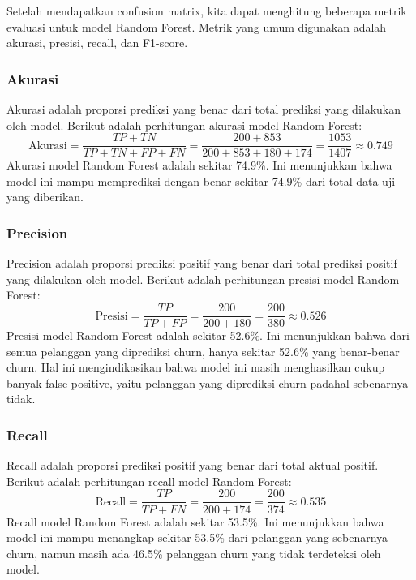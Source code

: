 Setelah mendapatkan confusion matrix, kita dapat menghitung beberapa metrik evaluasi untuk model Random Forest. Metrik yang umum digunakan adalah akurasi, presisi, recall, dan F1-score.

\subsubsection*{Akurasi}
Akurasi adalah proporsi prediksi yang benar dari total prediksi yang dilakukan oleh model. Berikut adalah perhitungan akurasi model Random Forest:
\begin{equation}
    \text{Akurasi} = \frac{TP + TN}{TP + TN + FP + FN} = \frac{200 + 853}{200 + 853 + 180 + 174} = \frac{1053}{1407} \approx 0.749
\end{equation}
Akurasi model Random Forest adalah sekitar 74.9\%. Ini menunjukkan bahwa model ini mampu memprediksi dengan benar sekitar 74.9\% dari total data uji yang diberikan.

\subsubsection*{Precision}
Precision adalah proporsi prediksi positif yang benar dari total prediksi positif yang dilakukan oleh model. Berikut adalah perhitungan presisi model Random Forest:
\begin{equation}
    \text{Presisi} = \frac{TP}{TP + FP} = \frac{200}{200 + 180} = \frac{200}{380} \approx 0.526
\end{equation}
Presisi model Random Forest adalah sekitar 52.6\%. Ini menunjukkan bahwa dari semua pelanggan yang diprediksi churn, hanya sekitar 52.6\% yang benar-benar churn. Hal ini mengindikasikan bahwa model ini masih menghasilkan cukup banyak false positive, yaitu pelanggan yang diprediksi churn padahal sebenarnya tidak.

\subsubsection*{Recall}
Recall adalah proporsi prediksi positif yang benar dari total aktual positif. Berikut adalah perhitungan recall model Random Forest:
\begin{equation}
    \text{Recall} = \frac{TP}{TP + FN} = \frac{200}{200 + 174} = \frac{200}{374} \approx 0.535
\end{equation}
Recall model Random Forest adalah sekitar 53.5\%. Ini menunjukkan bahwa model ini mampu menangkap sekitar 53.5\% dari pelanggan yang sebenarnya churn, namun masih ada 46.5\% pelanggan churn yang tidak terdeteksi oleh model.

